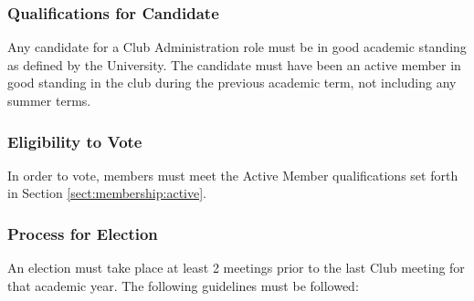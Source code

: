 \documentclass[english,11pt]{article}
\begin{document}
\subsubsection{Qualifications for Candidate} \label{subsect:cadmin:selection:qualifications}
Any candidate for a Club Administration role must be in good academic standing as defined by the University.
The candidate must have been an active member in good standing in the club during the previous academic term, not including any summer terms.

\subsubsection{Eligibility to Vote} \label{subsect:cadmin:selection:eligibility}
In order to vote, members must meet the Active Member qualifications set forth in Section \ref{sect:membership:active}.

\subsubsection{Process for Election} \label{subsect:cadmin:selection:election}
An election must take place at least 2 meetings prior to the last Club meeting for that academic year. The following guidelines must be followed:
\end{document}
